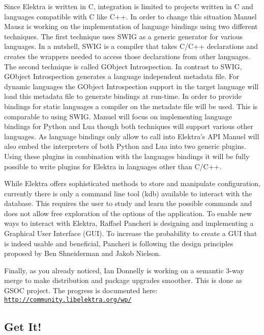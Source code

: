 Since Elektra is written in C, integration is limited to projects written in C and languages compatible with C like C++. In order to change this situation Manuel Mausz is working on the implementation of language bindings using two different techniques. The first technique uses S\+W\+IG as a generic generator for various languages. In a nutshell, S\+W\+IG is a compiler that takes C/\+C++ declarations and creates the wrappers needed to access those declarations from other languages. The second technique is called G\+Object Introspection. In contrast to S\+W\+IG, G\+Object Introspection generates a language independent metadata file. For dynamic languages the G\+Object Introspection support in the target language will load this metadata file to generate bindings at run-\/time. In order to provide bindings for static languages a compiler on the metadate file will be used. This is comparable to using S\+W\+IG. Manuel will focus on implementing language bindings for Python and Lua though both techniques will support various other languages. As language bindings only allow to call into Elektra’s A\+PI Manuel will also embed the interpreters of both Python and Lua into two generic plugins. Using these plugins in combination with the languages bindings it will be fully possible to write plugins for Elektra in languages other than C/\+C++.

While Elektra offers sophisticated methods to store and manipulate configuration, currently there is only a command line tool (kdb) available to interact with the database. This requires the user to study and learn the possible commands and does not allow free exploration of the options of the application. To enable new ways to interact with Elektra, Raffael Pancheri is designing and implementing a Graphical User Interface (G\+UI). To increase the probability to create a G\+UI that is indeed usable and beneficial, Pancheri is following the design principles proposed by Ben Shneiderman and Jakob Nielson.

Finally, as you already noticed, Ian Donnelly is working on a semantic 3-\/way merge to make distribution and package upgrades smoother. This is done as G\+S\+OC project. The progress is documented here\+: \href{http://community.libelektra.org/wp/}{\tt http\+://community.\+libelektra.\+org/wp/}

\subsection*{Get It!}

